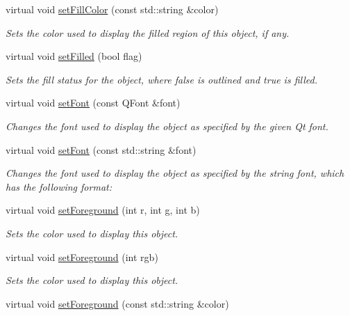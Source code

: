 \begin{DoxyCompactItemize}
virtual void \mbox{\hyperlink{classsgl_1_1GObject_adbc18b1a930aadd97d7437f9f7265b96}{set\+Fill\+Color}} (const std\+::string \&color)
\begin{DoxyCompactList}\small\item\em Sets the color used to display the filled region of this object, if any. \end{DoxyCompactList}\item 
virtual void \mbox{\hyperlink{classsgl_1_1GObject_a9b82b53362282c6bb7d6947068d2e55b}{set\+Filled}} (bool flag)
\begin{DoxyCompactList}\small\item\em Sets the fill status for the object, where {\ttfamily false} is outlined and {\ttfamily true} is filled. \end{DoxyCompactList}\item 
virtual void \mbox{\hyperlink{classsgl_1_1GObject_a2592348886ffea646c6534bf88f7c49d}{set\+Font}} (const Q\+Font \&font)
\begin{DoxyCompactList}\small\item\em Changes the font used to display the object as specified by the given Qt font. \end{DoxyCompactList}\item 
virtual void \mbox{\hyperlink{classsgl_1_1GObject_a8e096e8818d838aceae1d46d58fb3a7b}{set\+Font}} (const std\+::string \&font)
\begin{DoxyCompactList}\small\item\em Changes the font used to display the object as specified by the string {\ttfamily font}, which has the following format\+: \end{DoxyCompactList}\item 
virtual void \mbox{\hyperlink{classsgl_1_1GObject_ad18e8fab1e02a4e9b75c6730212558eb}{set\+Foreground}} (int r, int g, int b)
\begin{DoxyCompactList}\small\item\em Sets the color used to display this object. \end{DoxyCompactList}\item 
virtual void \mbox{\hyperlink{classsgl_1_1GObject_a9eb856b5ff83a19df3831a31f15f4563}{set\+Foreground}} (int rgb)
\begin{DoxyCompactList}\small\item\em Sets the color used to display this object. \end{DoxyCompactList}\item 
virtual void \mbox{\hyperlink{classsgl_1_1GObject_af59209aeadea6dfc6d97a2d8531f50e1}{set\+Foreground}} (const std\+::string \&color)

\end{DoxyCompactItemize}
